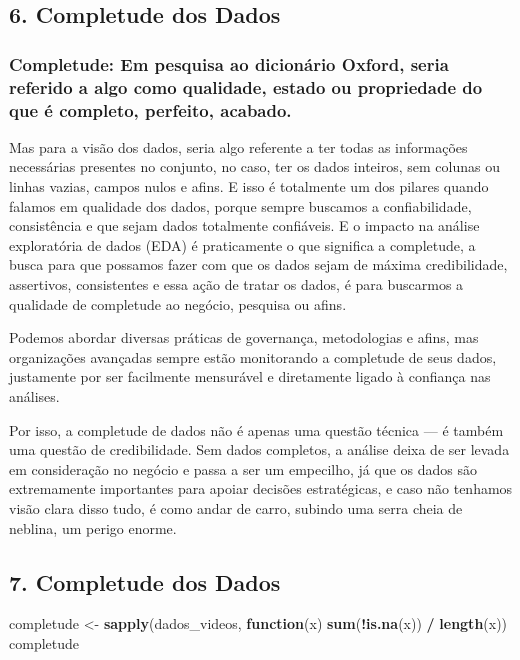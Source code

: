 \documentclass[
]{article}
\newenvironment{Shaded}{\begin{snugshade}}{\end{snugshade}}
\newcommand{\ControlFlowTok}[1]{\textcolor[rgb]{0.13,0.29,0.53}{\textbf{#1}}}
\newcommand{\FunctionTok}[1]{\textcolor[rgb]{0.13,0.29,0.53}{\textbf{#1}}}
\newcommand{\NormalTok}[1]{#1}
\newcommand{\OtherTok}[1]{\textcolor[rgb]{0.56,0.35,0.01}{#1}}
\newcommand{\SpecialCharTok}[1]{\textcolor[rgb]{0.81,0.36,0.00}{\textbf{#1}}}
\begin{document}
\subsection{6. Completude dos Dados}\label{completude-dos-dados}

\subsubsection{Completude: Em pesquisa ao dicionário Oxford, seria
referido a algo como qualidade, estado ou propriedade do que é completo,
perfeito,
acabado.}\label{completude-em-pesquisa-ao-dicionuxe1rio-oxford-seria-referido-a-algo-como-qualidade-estado-ou-propriedade-do-que-uxe9-completo-perfeito-acabado.}

Mas para a visão dos dados, seria algo referente a ter todas as
informações necessárias presentes no conjunto, no caso, ter os dados
inteiros, sem colunas ou linhas vazias, campos nulos e afins. E isso é
totalmente um dos pilares quando falamos em qualidade dos dados, porque
sempre buscamos a confiabilidade, consistência e que sejam dados
totalmente confiáveis. E o impacto na análise exploratória de dados
(EDA) é praticamente o que significa a completude, a busca para que
possamos fazer com que os dados sejam de máxima credibilidade,
assertivos, consistentes e essa ação de tratar os dados, é para
buscarmos a qualidade de completude ao negócio, pesquisa ou afins.

Podemos abordar diversas práticas de governança, metodologias e afins,
mas organizações avançadas sempre estão monitorando a completude de seus
dados, justamente por ser facilmente mensurável e diretamente ligado à
confiança nas análises.

Por isso, a completude de dados não é apenas uma questão técnica --- é
também uma questão de credibilidade. Sem dados completos, a análise
deixa de ser levada em consideração no negócio e passa a ser um
empecilho, já que os dados são extremamente importantes para apoiar
decisões estratégicas, e caso não tenhamos visão clara disso tudo, é
como andar de carro, subindo uma serra cheia de neblina, um perigo
enorme.

\subsection{7. Completude dos Dados}\label{completude-dos-dados-1}

\begin{Shaded}
\begin{Highlighting}[]
\NormalTok{completude }\OtherTok{\textless{}{-}} \FunctionTok{sapply}\NormalTok{(dados\_videos, }\ControlFlowTok{function}\NormalTok{(x) }\FunctionTok{sum}\NormalTok{(}\SpecialCharTok{!}\FunctionTok{is.na}\NormalTok{(x)) }\SpecialCharTok{/} \FunctionTok{length}\NormalTok{(x))}
\NormalTok{completude}
\end{Highlighting}
\end{Shaded}
\end{document}
